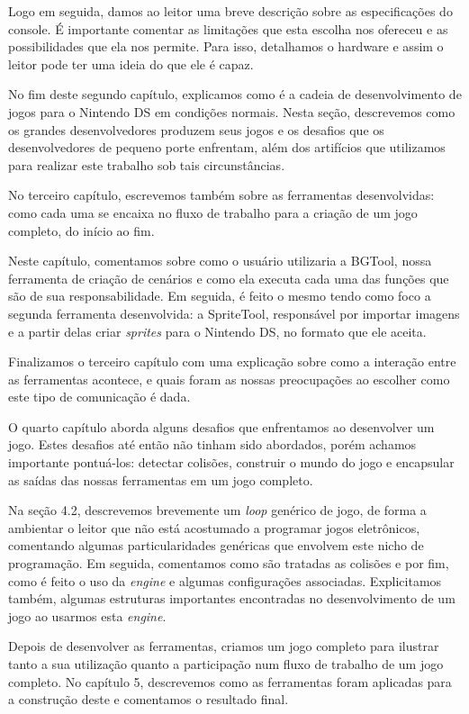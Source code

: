 \documentclass[brazil]{abnt}
\begin{document}
Logo em seguida, damos ao leitor uma breve descrição sobre as especificações do console. É importante comentar as limitações que esta escolha nos ofereceu e as possibilidades que ela nos permite. Para isso, detalhamos o hardware e assim o leitor pode ter uma ideia do que ele é capaz.

No fim deste segundo capítulo, explicamos como é a cadeia de desenvolvimento de jogos para o Nintendo DS em condições normais. Nesta seção, descrevemos como os grandes desenvolvedores produzem seus jogos e os desafios que os desenvolvedores de pequeno porte enfrentam, além dos artifícios que utilizamos para realizar este trabalho sob tais circunstâncias.

No terceiro capítulo, escrevemos também sobre as ferramentas desenvolvidas: como cada uma se encaixa no fluxo de trabalho para a criação de um jogo completo, do início ao fim.

Neste capítulo, comentamos sobre como o usuário utilizaria a BGTool, nossa ferramenta de criação de cenários e como ela executa cada uma das funções que são de sua responsabilidade. Em seguida, é feito o mesmo tendo como foco a segunda ferramenta desenvolvida: a SpriteTool, responsável por importar imagens e a partir delas criar \textit{sprites} para o Nintendo DS, no formato que ele aceita.

Finalizamos o terceiro capítulo com uma explicação sobre como a interação entre as ferramentas acontece, e quais foram as nossas preocupações ao escolher como este tipo de comunicação é dada.

O quarto capítulo aborda alguns desafios que enfrentamos ao desenvolver um jogo. Estes desafios até então não tinham sido abordados, porém achamos importante pontuá-los: detectar colisões, construir o mundo do jogo e encapsular as saídas das nossas ferramentas em um jogo completo.

Na seção 4.2, descrevemos brevemente um \textit{loop} genérico de jogo, de forma a ambientar o leitor que não está acostumado a programar jogos eletrônicos, comentando algumas particularidades genéricas que envolvem este nicho de programação. Em seguida, comentamos como são tratadas as colisões e por fim, como é feito o uso da \textit{engine} e algumas configurações associadas. Explicitamos também, algumas estruturas importantes encontradas no desenvolvimento de um jogo ao usarmos esta \textit{engine}.

Depois de desenvolver as ferramentas, criamos um jogo completo para ilustrar tanto a sua utilização quanto a participação num fluxo de trabalho de um jogo completo. No capítulo 5, descrevemos como as ferramentas foram aplicadas para a construção deste e comentamos o resultado final.
\end{document}
